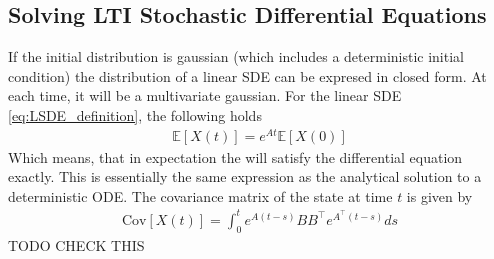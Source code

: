 \subsection*{Solving LTI Stochastic Differential Equations}
If the initial distribution is gaussian (which includes a deterministic initial condition) the distribution of a linear SDE can be expresed in closed form. At each time, it will be a multivariate gaussian. For the linear SDE \ref{eq:LSDE_definition}, the following holds
\begin{align}\label{eq:SDE_mean}
    \mathbb{E}[X(t)] = e^{At}\mathbb{E}[X(0)]
\end{align}
Which means, that in expectation the will satisfy the differential equation exactly. This is essentially the same expression as the analytical solution to a deterministic ODE. The covariance matrix of the state at time $t$ is given by
\begin{align}\label{eq:SDE_cov}
    \text{Cov}[X(t)] = \int_0^t e^{A(t-s)}BB^\top e^{A^\top(t-s)} ds
\end{align} TODO CHECK THIS


